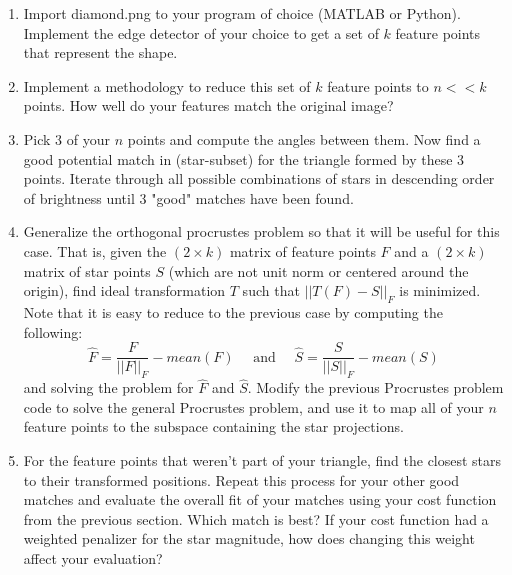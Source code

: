 \documentclass[paper=a4, fontsize=11pt]{scrartcl} %
\begin{document}
\begin{enumerate}
  \item
  Import diamond.png to your program of choice (MATLAB or Python). Implement the edge detector of your choice to get a set of $k$ feature points that represent the shape. 
  \item 
  Implement a methodology to reduce this set of $k$ feature points to $n << k$  points. How well do your features match the original image?
  \item
  Pick $3$ of your $n$ points and compute the angles between them. Now find a good potential match in (star-subset) for the triangle formed by these 3 points. Iterate through all possible combinations of stars in descending order of brightness until 3 "good" matches have been found.
  \item
  Generalize the orthogonal procrustes problem so that it will be useful for this case. That is, given the $(2\times k)$ matrix of feature points $F$ and a  $(2\times k)$ matrix of star points $S$ (which are not unit norm or centered around the origin), find ideal transformation $T$ such that $||T(F)-S||_F$ is minimized.  Note that it is easy to reduce to the previous case by computing the following:
  $$
  \hat{F} = \frac{F}{||F||_F} - mean(F)\quad\textrm{ and }\quad\hat{S} = \frac{S}{||S||_F} - mean(S)
  $$
  and solving the problem for $\hat{F}$ and $\hat{S}$. Modify the previous Procrustes problem code to solve the general Procrustes problem, and use it to map all of your $n$ feature points to the subspace containing the star projections.
  \item
  For the feature points that weren't part of your triangle, find the closest stars to their transformed positions. Repeat this process for your other good matches and evaluate the overall fit of your matches using your cost function from the previous section. Which match is best? If your cost function had a weighted penalizer for the star magnitude, how does changing this weight affect your evaluation?
\end{enumerate}



\end{document}
